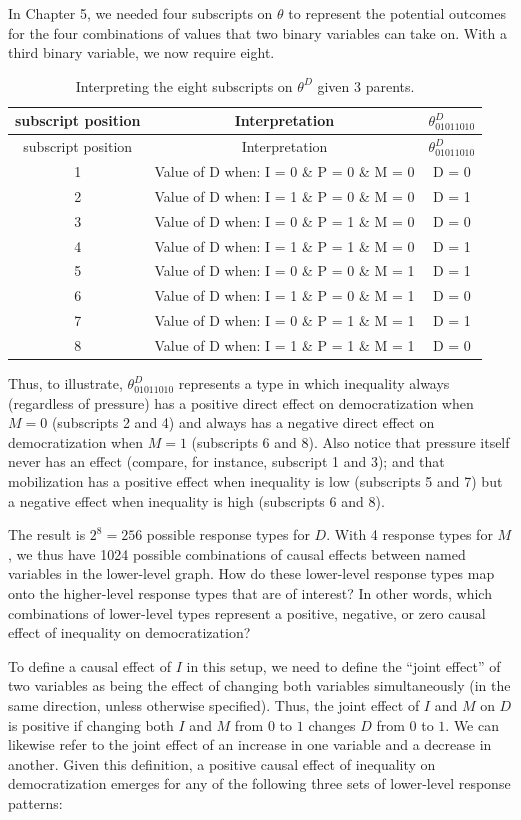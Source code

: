 \documentclass[12pt,]{book}
\begin{document}
In Chapter 5, we needed four subscripts on \(\theta\) to represent the potential outcomes for the four combinations of values that two binary variables can take on. With a third binary variable, we now require eight.

\begin{longtable}[]{@{}ccc@{}}
\caption{\label{tab:interpretation} Interpreting the eight subscripts on \(\theta^D\) given 3 parents.}\tabularnewline
\toprule
subscript position & Interpretation & \(\theta^D_{01011010}\)\tabularnewline
\midrule
\endfirsthead
\toprule
subscript position & Interpretation & \(\theta^D_{01011010}\)\tabularnewline
\midrule
\endhead
1 & Value of D when: I = 0 \& P = 0 \& M = 0 & D = 0\tabularnewline
2 & Value of D when: I = 1 \& P = 0 \& M = 0 & D = 1\tabularnewline
3 & Value of D when: I = 0 \& P = 1 \& M = 0 & D = 0\tabularnewline
4 & Value of D when: I = 1 \& P = 1 \& M = 0 & D = 1\tabularnewline
5 & Value of D when: I = 0 \& P = 0 \& M = 1 & D = 1\tabularnewline
6 & Value of D when: I = 1 \& P = 0 \& M = 1 & D = 0\tabularnewline
7 & Value of D when: I = 0 \& P = 1 \& M = 1 & D = 1\tabularnewline
8 & Value of D when: I = 1 \& P = 1 \& M = 1 & D = 0\tabularnewline
\bottomrule
\end{longtable}

Thus, to illustrate, \(\theta^D_{01011010}\) represents a type in which inequality always (regardless of pressure) has a positive direct effect on democratization when \(M=0\) (subscripts 2 and 4) and always has a negative direct effect on democratization when \(M=1\) (subscripts 6 and 8). Also notice that pressure itself never has an effect (compare, for instance, subscript 1 and 3); and that mobilization has a positive effect when inequality is low (subscripts 5 and 7) but a negative effect when inequality is high (subscripts 6 and 8).

The result is \(2^8=256\) possible response types for \(D\). With 4 response types for \(M\), we thus have 1024 possible combinations of causal effects between named variables in the lower-level graph. How do these lower-level response types map onto the higher-level response types that are of interest? In other words, which combinations of lower-level types represent a positive, negative, or zero causal effect of inequality on democratization?

To define a causal effect of \(I\) in this setup, we need to define the ``joint effect'' of two variables as being the effect of changing both variables simultaneously (in the same direction, unless otherwise specified). Thus, the joint effect of \(I\) and \(M\) on \(D\) is positive if changing both \(I\) and \(M\) from \(0\) to \(1\) changes \(D\) from \(0\) to \(1\). We can likewise refer to the joint effect of an increase in one variable and a decrease in another. Given this definition, a positive causal effect of inequality on democratization emerges for any of the following three sets of lower-level response patterns:
\end{document}
